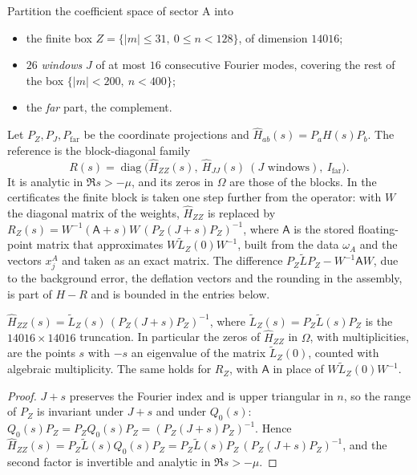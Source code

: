 Partition the coefficient space of sector A into
\begin{itemize}[leftmargin=*]
\item the finite box $Z=\{|m|\le31,\ 0\le n<128\}$, of dimension $14016$;
\item $26$ \emph{windows} $J$ of at most $16$ consecutive Fourier modes, covering the rest of the box
  $\{|m|<200,\ n<400\}$;
\item the \emph{far} part, the complement.
\end{itemize}
Let $P_Z,P_J,P_{\mathrm{far}}$ be the coordinate projections and $\widehat H_{ab}(s)=P_aH(s)P_b$. The reference is the
block-diagonal family
\[
  R(s)=\operatorname{diag}\big(\widehat H_{ZZ}(s),\ \widehat H_{JJ}(s)\ (J\text{ windows}),\ I_{\mathrm{far}}\big).
\]
It is analytic in $\Re s>-\mu$, and its zeros in $\Omega$ are those of the blocks. In the certificates the finite
block is taken one step further from the operator: with $W$ the diagonal matrix of the weights, $\widehat H_{ZZ}$ is
replaced by $R_Z(s)=W^{-1}(\mathsf A+s)W\,(P_Z(J+s)P_Z)^{-1}$, where $\mathsf A$ is the stored floating-point matrix that
approximates $W\widetilde L_Z(0)W^{-1}$, built from the data $\omega_A$ and the vectors $x_j^A$ and taken as an exact
matrix. The difference $P_Z\widetilde LP_Z-W^{-1}\mathsf AW$, due to the background error, the deflation vectors and
the rounding in the assembly, is part of $H-R$ and is bounded in the entries below.

\begin{lemma}\label{lem:ZZ}
$\widehat H_{ZZ}(s)=\widetilde L_Z(s)\,(P_Z(J+s)P_Z)^{-1}$, where $\widetilde L_Z(s)=P_Z\widetilde L(s)P_Z$ is the
$14016\times14016$ truncation. In particular the zeros of $\widehat H_{ZZ}$ in $\Omega$, with multiplicities, are
the points $s$ with $-s$ an eigenvalue of the matrix $\widetilde L_Z(0)$, counted with algebraic multiplicity. The same
holds for $R_Z$, with $\mathsf A$ in place of $W\widetilde L_Z(0)W^{-1}$.
\end{lemma}

\begin{proof}
$J+s$ preserves the Fourier index and is upper triangular in $n$, so the range of $P_Z$ is invariant under
$J+s$ and under $Q_0(s)$: $Q_0(s)P_Z=P_ZQ_0(s)P_Z=(P_Z(J+s)P_Z)^{-1}$. Hence
$\widehat H_{ZZ}(s)=P_Z\widetilde L(s)Q_0(s)P_Z=P_Z\widetilde L(s)P_Z\,(P_Z(J+s)P_Z)^{-1}$, and the second factor is
invertible and analytic in $\Re s>-\mu$.
\end{proof}

